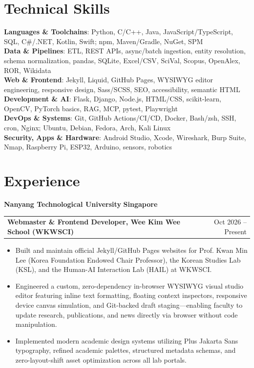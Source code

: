 \documentclass[10pt,a4paper]{article}
\makeatletter
\newcommand{\resumeItem}[1]{
  \item\small{#1}
}
\newcommand{\resumeRole}[2]{
  \vspace{3pt}
  \begin{tabular*}{\textwidth}[t]{l@{\extracolsep{\fill}}r}
    \textbf{\small#1} & {\small #2} \\
  \end{tabular*}\vspace{0pt}
}
\makeatother
\begin{document}
\section{Technical Skills}
 \begin{itemize}[leftmargin=0.15in, label={}]
    \small{\item{
     \textbf{Languages \& Toolchains}: Python, C/C++, Java, JavaScript/TypeScript, SQL, C\#/.NET, Kotlin, Swift; npm, Maven/Gradle, NuGet, SPM \\[2pt]
     \textbf{Data \& Pipelines}: ETL, REST APIs, async/batch ingestion, entity resolution, schema normalization, pandas, SQLite, Excel/CSV, SciVal, Scopus, OpenAlex, ROR, Wikidata \\[2pt]
     \textbf{Web \& Frontend}: Jekyll, Liquid, GitHub Pages, WYSIWYG editor engineering, responsive design, Sass/SCSS, SEO, accessibility, semantic HTML \\[2pt]
     \textbf{Development \& AI}: Flask, Django, Node.js, HTML/CSS, scikit-learn, OpenCV, PyTorch basics, RAG, MCP, pytest, Playwright \\[2pt]
     \textbf{DevOps \& Systems}: Git, GitHub Actions/CI/CD, Docker, Bash/zsh, SSH, cron, Nginx; Ubuntu, Debian, Fedora, Arch, Kali Linux \\[2pt]
     \textbf{Security, Apps \& Hardware}: Android Studio, Xcode, Wireshark, Burp Suite, Nmap, Raspberry Pi, ESP32, Arduino, sensors, robotics
    }}
 \end{itemize}

\section{Experience}

  \textbf{Nanyang Technological University} \hfill \textbf{\small Singapore} \\
  \vspace{1pt}

  \resumeRole{Webmaster \& Frontend Developer, Wee Kim Wee School (WKWSCI)}{Oct 2026 -- Present}
  \begin{itemize}
    \resumeItem{Built and maintain official Jekyll/GitHub Pages websites for Prof. Kwan Min Lee (Korea Foundation Endowed Chair Professor), the Korean Studies Lab (KSL), and the Human-AI Interaction Lab (HAIL) at WKWSCI.}
    \resumeItem{Engineered a custom, zero-dependency in-browser WYSIWYG visual studio editor featuring inline text formatting, floating context inspectors, responsive device canvas simulation, and Git-backed draft staging---enabling faculty to update research, publications, and news directly via browser without code manipulation.}
    \resumeItem{Implemented modern academic design systems utilizing Plus Jakarta Sans typography, refined academic palettes, structured metadata schemas, and zero-layout-shift asset optimization across all lab portals.}
  \end{itemize}
\end{document}
